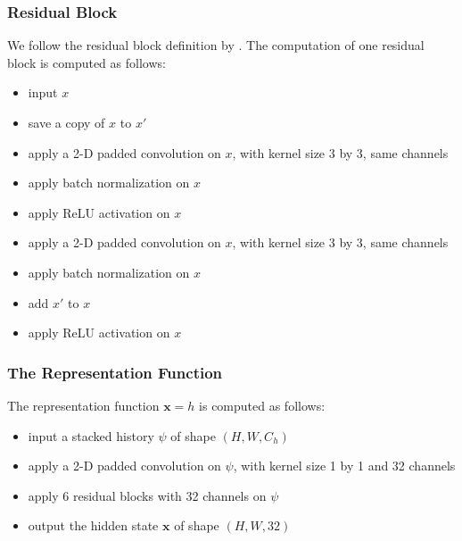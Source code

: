 \subsubsection{Residual Block}
We follow the residual block definition by \citeauthor{DeepResidualLearning_He.Zhang.ea_2016} \cite{DeepResidualLearning_He.Zhang.ea_2016}.
The computation of one residual block is computed as follows:
\begin{itemize}
    \item input $x$
    \item save a copy of $x$ to $x'$
    \item apply a 2-D padded convolution on $x$, with kernel size 3 by 3, same channels
    \item apply batch normalization on $x$
    \item apply ReLU activation on $x$
    \item apply a 2-D padded convolution on $x$, with kernel size 3 by 3, same channels
    \item apply batch normalization on $x$
    \item add $x'$ to $x$
    \item apply ReLU activation on $x$
\end{itemize}

\subsubsection{The Representation Function}
The representation function $\mathbf{x} = h$ is computed as follows:
\begin{itemize}
    \item input a stacked history $\psi$ of shape $(H, W, C_h)$
    \item apply a 2-D padded convolution on $\psi$, with kernel size 1 by 1 and 32 channels
    \item apply 6 residual blocks with 32 channels on $\psi$
    \item output the hidden state $\mathbf{x}$ of shape $(H, W, 32)$
\end{itemize}

